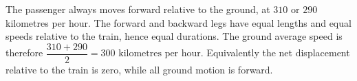 The passenger always moves forward relative to the ground, at $310$ or $290$ kilometres per hour. The forward and backward legs have equal lengths and equal speeds relative to the train, hence equal durations. The ground average speed is therefore $\dfrac{310+290}{2}=\boxed{300\text{ kilometres per hour}}$. Equivalently the net displacement relative to the train is zero, while all ground motion is forward.
